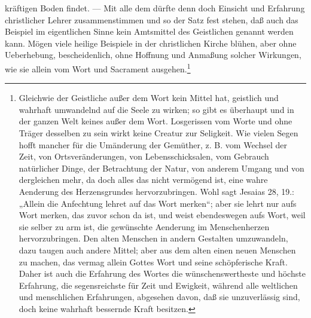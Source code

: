 kräftigen Boden findet. — Mit alle dem dürfte denn doch Einsicht und Erfahrung christlicher Lehrer zusammenstimmen und so der Satz fest stehen, daß auch das Beispiel im eigentlichen Sinne kein Amtsmittel des Geistlichen genannt werden kann. Mögen viele heilige Beispiele in der christlichen Kirche blühen, aber ohne Ueberhebung, bescheidenlich, ohne Hoffnung und Anmaßung solcher Wirkungen, wie sie allein vom Wort und Sacrament ausgehen.\footnote{Gleichwie der Geistliche außer dem Wort kein Mittel hat, geistlich und wahrhaft umwandelnd auf die Seele zu wirken; so gibt es überhaupt und in der ganzen Welt keines außer dem Wort. Losgerissen vom Worte und ohne Träger desselben zu sein wirkt keine Creatur zur Seligkeit. Wie vielen Segen hofft mancher für die Umänderung der Gemüther, z. B. vom Wechsel der Zeit, von Ortsveränderungen, von Lebensschicksalen, vom Gebrauch natürlicher Dinge, der Betrachtung der Natur, von anderem Umgang und von dergleichen mehr, da doch alles das nicht vermögend ist, eine wahre Aenderung des Herzensgrundes hervorzubringen. Wohl sagt Jesaias 28, 19.: „Allein die Anfechtung lehret auf das Wort merken“; aber sie lehrt nur aufs Wort merken, das zuvor schon da ist, und weist ebendeswegen aufs Wort, weil sie selber zu arm ist, die gewünschte Aenderung im Menschenherzen hervorzubringen. Den alten Menschen in andern Gestalten umzuwandeln, dazu taugen auch andere Mittel; aber aus dem alten einen neuen Menschen zu machen, das vermag allein Gottes Wort und seine schöpferische Kraft. Daher ist auch die Erfahrung des Wortes die wünschenswertheste und höchste Erfahrung, die segensreichste für Zeit und Ewigkeit, während alle weltlichen und menschlichen Erfahrungen, abgesehen davon, daß sie unzuverlässig sind, doch keine wahrhaft bessernde Kraft besitzen.}

